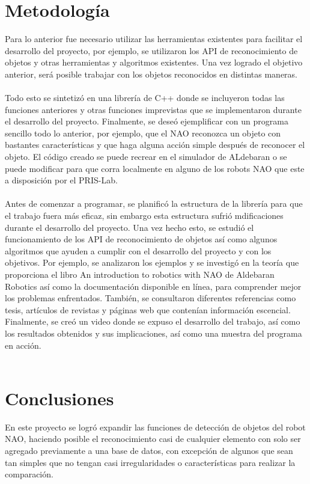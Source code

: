 \documentclass[letterpaper]{article}
\begin{document}
\section{Metodología}
Para lo anterior fue necesario utilizar las herramientas existentes para facilitar el desarrollo del proyecto, por ejemplo, se utilizaron los API de reconocimiento de objetos y otras herramientas y algoritmos existentes. Una vez logrado el objetivo anterior, será posible trabajar con los objetos reconocidos en distintas maneras.\\\\
Todo esto se sintetizó en una librería de C++ donde se incluyeron todas las funciones anteriores y otras funciones imprevistas que se implementaron durante el desarrollo del proyecto. Finalmente, se deseó ejemplificar con un programa sencillo todo lo anterior, por ejemplo, que el NAO reconozca un objeto con bastantes características y que haga alguna acción simple después de reconocer el objeto. El código creado se puede  recrear en el simulador de ALdebaran o se puede modificar para que corra localmente en alguno de los robots NAO que este a disposición por el PRIS-Lab.\\\\
Antes de comenzar a programar, se planificó la estructura de la librería para que el trabajo fuera más eficaz, sin embargo esta estructura sufrió mdificaciones durante el desarrollo del proyecto. Una vez hecho esto, se estudió el funcionamiento de los API de reconocimiento de objetos así como algunos algoritmos que ayuden a cumplir con el desarrollo del proyecto y con los objetivos. Por ejemplo, se analizaron los ejemplos y se investigó en la teoría que proporciona el libro An introduction to robotics with NAO de Aldebaran Robotics así como la documentación disponible en línea, para comprender mejor los problemas enfrentados. También, se consultaron diferentes referencias como tesis, artículos de revistas y páginas web que contenían información escencial. Finalmente, se creó un video donde se expuso el desarrollo del trabajo, así como los resultados obtenidos y sus implicaciones, así como una muestra del programa en acción.\\\\


\section{Conclusiones}
En este proyecto se logró expandir las funciones de detección de objetos del robot NAO, haciendo posible el reconocimiento casi de cualquier elemento con solo ser agregado previamente a una base de datos, con excepción de algunos que sean tan simples que no tengan casi irregularidades o características para realizar la comparación.\\\\ 
	
\end{document}
